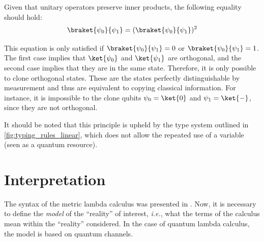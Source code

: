 Given that unitary operators preserve inner products, the following equality should hold:
\begin{equation*}
  \braket{\psi_0}{\psi_1} = ( \braket{\psi_0}{\psi_1})^{2}
\end{equation*}

This equation is only satisfied if $\braket{\psi_0}{\psi_1} = 0$ or $\braket{\psi_0}{\psi_1} = 1$. The first case implies that $\ket{\psi_0}$ and $\ket{\psi_1}$ are orthogonal, and the second case implies that they are in the same state. Therefore, it is only possible to clone orthogonal states. These are the states perfectly distinguishable by measurement and thus are equivalent to copying classical information. For instance, it is impossible to the clone qubits $\psi_0 = \ket{0}$ and $\psi_1 = \ket{-}$, since they are not orthogonal.

It should be noted that this principle is upheld by the type system outlined in \autoref{fig:typing_rules_linear}, which does not allow the repeated use of a variable (seen as a quantum resource).




\section{Interpretation} \label{sec:Quantum Lambda Calculus:Interpretation}
The syntax of the metric lambda calculus was presented in . Now, it is necessary to define the \emph{model} of the ``reality'' of interest, \textit{i.e.}, what the terms of the calculus mean within the ``reality'' considered. In the case of quantum lambda calculus, the model is based on quantum channels. 



